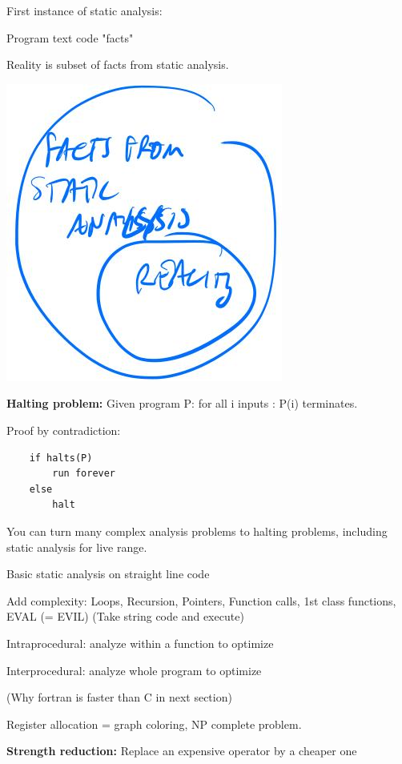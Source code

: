\documentclass[twoside]{article}
\begin{document}
First instance of static analysis:

Program text code  "facts"

Reality is subset of facts from static analysis.

\begin{center}
    \includegraphics[scale = 0.32]{reality_subset.jpg}    
\end{center}

\textbf{Halting problem:} Given program P: for all i inputs : P(i) terminates.

Proof by contradiction:
\begin{verbatim}
    if halts(P)
        run forever
    else
        halt
\end{verbatim}
    
You can turn many complex analysis problems to halting problems, including static analysis for live range.

Basic static analysis on straight line code

Add complexity: Loops, Recursion, Pointers, Function calls, 1st class functions, EVAL (= EVIL) (Take string code and execute)

Intraprocedural: analyze within a function to optimize

Interprocedural: analyze whole program to optimize

(Why fortran is faster than C in next section)

Register allocation = graph coloring, NP complete problem.

\textbf{Strength reduction:} Replace an expensive operator by a cheaper one
\end{document}
